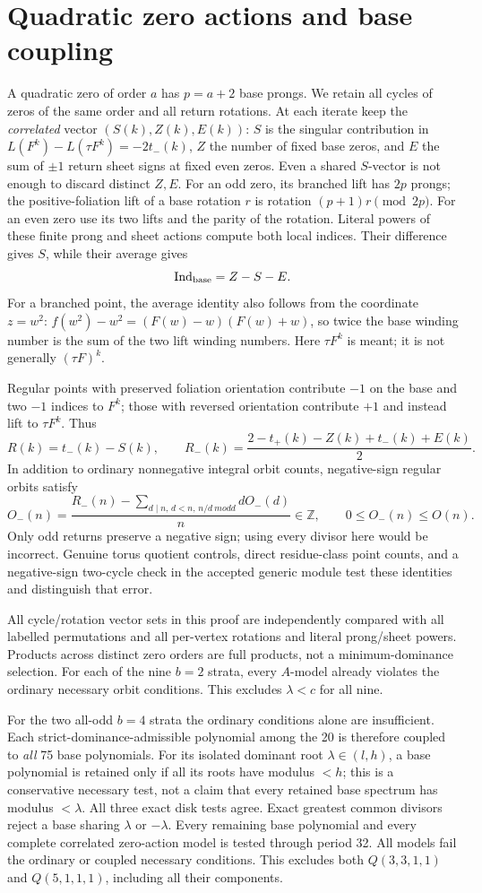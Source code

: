\documentclass[11pt]{article}
\begin{document}
\section{Quadratic zero actions and base coupling}
A quadratic zero of order $a$ has $p=a+2$ base prongs. We retain all cycles
of zeros of the same order and all return rotations. At each iterate keep
the \emph{correlated} vector $(S(k),Z(k),E(k))$: $S$ is the singular
contribution in $L(F^k)-L(\tau F^k)=-2t_-(k)$, $Z$ the number of fixed
base zeros, and $E$ the sum of $\pm1$ return sheet signs at fixed even
zeros. Even a shared $S$-vector is not enough to discard distinct $Z,E$.
For an odd zero, its branched lift has $2p$ prongs; the positive-foliation
lift of a base rotation $r$ is rotation $(p+1)r\pmod{2p}$.
For an even zero use its two lifts and the parity of the rotation.
Literal powers of these finite prong and sheet actions compute both local
indices. Their difference gives $S$, while their average gives
\[
 \operatorname{Ind}_{\rm base}=Z-S-E.
\]
For a branched point, the average identity also follows from the coordinate
$z=w^2$: $f(w^2)-w^2=(F(w)-w)(F(w)+w)$, so twice the base winding number
is the sum of the two lift winding numbers. Here $\tau F^k$ is meant;
it is not generally $(\tau F)^k$.

Regular points with preserved foliation orientation contribute $-1$ on
the base and two $-1$ indices to $F^k$; those with reversed orientation
contribute $+1$ and instead lift to $\tau F^k$. Thus
\[
 R(k)=t_-(k)-S(k),\qquad
 R_-(k)=\frac{2-t_+(k)-Z(k)+t_-(k)+E(k)}2.
\]
In addition to ordinary nonnegative integral orbit counts, negative-sign
regular orbits satisfy
\[
 O_-(n)=\frac{R_-(n)-
 \sum_{d\mid n,\,d<n,\,n/d\ {
m odd}}dO_-(d)}n
 \in\mathbb Z,\qquad 0\leq O_-(n)\leq O(n).
\]
Only odd returns preserve a negative sign; using every divisor here would
be incorrect. Genuine torus quotient controls, direct residue-class point
counts, and a negative-sign two-cycle check in the accepted generic module
test these identities and distinguish that error.

All cycle/rotation vector sets in this proof are independently compared
with all labelled permutations and all per-vertex rotations and literal
prong/sheet powers. Products across distinct zero orders are full products,
not a minimum-dominance selection. For each of the nine $b=2$ strata,
every $A$-model already violates the ordinary necessary orbit conditions.
This excludes $\lambda<c$ for all nine.

For the two all-odd $b=4$ strata the ordinary conditions alone are
insufficient. Each strict-dominance-admissible polynomial among the 20 is
therefore coupled to \emph{all} 75 base polynomials. For its isolated
dominant root $\lambda\in(l,h)$, a base polynomial is retained only if all
its roots have modulus $<h$; this is a conservative necessary test, not a
claim that every retained base spectrum has modulus $<\lambda$.
All three exact disk tests agree. Exact greatest common divisors reject a
base sharing $\lambda$ or $-\lambda$. Every remaining base polynomial and
every complete correlated zero-action model is tested through period 32.
All models fail the ordinary or coupled necessary conditions. This excludes
both $Q(3,3,1,1)$ and $Q(5,1,1,1)$, including all their components.
\end{document}
